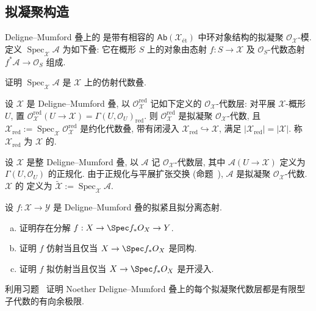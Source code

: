 \subsection{拟凝聚构造}\label{src:5.1.5-subsection}
Deligne--Mumford 叠上的 是带有相容的 $\mathsf{Ab}(\mathcal X_{\text{ét}})$ 中环对象结构的拟凝聚 $\mathcal O_{\mathcal X}$-模. 定义 $\operatorname{Spec}_{\mathcal X}\mathcal A$ 为如下叠: 它在概形 $S$ 上的对象由态射 $f:S\to\mathcal X$ 及 $\mathcal O_S$-代数态射 $f^*\mathcal A\to\mathcal O_S$ 组成.
\begin{exercise}[简单, 有益的练习]\label{src:5.1.29}
证明 $\operatorname{Spec}_{\mathcal X}\mathcal A$ 是 $\mathcal X$ 上的仿射代数叠.
\end{exercise}
\begin{example}[约化]\label{src:5.1.30}
设 $\mathcal X$ 是 Deligne--Mumford 叠, 以 $\mathcal O^{\mathrm{red}}_{\mathcal X}$ 记如下定义的 $\mathcal O_{\mathcal X}$-代数层: 对平展 $\mathcal X$-概形 $U$, 置 $\mathcal O^{\mathrm{red}}_{\mathcal X}(U\to\mathcal X)=\Gamma(U,\mathcal O_U)_{\mathrm{red}}$. 则 $\mathcal O^{\mathrm{red}}_{\mathcal X}$ 是拟凝聚 $\mathcal O_{\mathcal X}$-代数, 且 $\mathcal X_{\mathrm{red}}:=\operatorname{Spec}_{\mathcal X}\mathcal O^{\mathrm{red}}_{\mathcal X}$ 是约化代数叠, 带有闭浸入 $\mathcal X_{\mathrm{red}}\hookrightarrow\mathcal X$, 满足 $|\mathcal X_{\mathrm{red}}|=|\mathcal X|$. 称 $\mathcal X_{\mathrm{red}}$ 为 $\mathcal X$ 的.
\end{example}
\begin{example}[正规化]\label{src:5.1.31}
设 $\mathcal X$ 是整 Deligne--Mumford 叠, 以 $\mathcal A$ 记 $\mathcal O_{\mathcal X}$-代数层, 其中 $\mathcal A(U\to\mathcal X)$ 定义为 $\Gamma(U,\mathcal O_U)$ 的正规化. 由于正规化与平展扩张交换 (命题~), $\mathcal A$ 是拟凝聚 $\mathcal O_{\mathcal X}$-代数. $\mathcal X$ 的 定义为 $\widetilde{\mathcal X}:=\operatorname{Spec}_{\mathcal X}\mathcal A$.
\end{example}
\begin{exercise}[有益的练习]\label{src:5.1.32}
设 $f:\mathcal X\to\mathcal Y$ 是 Deligne--Mumford 叠的拟紧且拟分离态射.
\begin{enumerate}[(a)]
\item 证明存在分解 $f:\mathcal X\to\Spec f_*\mathcal O_{\mathcal X}\to\mathcal Y$.
\item 证明 $f$ 仿射当且仅当 $\mathcal X\to\Spec f_*\mathcal O_{\mathcal X}$ 是同构.
\item 证明 $f$ 拟仿射当且仅当 $\mathcal X\to\Spec f_*\mathcal O_{\mathcal X}$ 是开浸入.
\end{enumerate}
\end{exercise}
\begin{exercise}[细节]\label{src:5.1.33}
利用习题~ 证明 Noether Deligne--Mumford 叠上的每个拟凝聚代数层都是有限型子代数的有向余极限.
\end{exercise}


